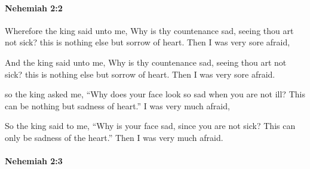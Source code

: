 		\paragraph{Nehemiah 2:2} %
			\label{NEHEMIAH-2-2}

			Wherefore the king said unto me, Why is thy countenance sad, seeing thou art not sick? this is nothing else but sorrow of heart. Then I was very sore afraid,

			\begin{versebox}
					\item[BHS] 
					\item[LXX] 
					\item[ASV] And the king said unto me, Why is thy countenance sad, seeing thou art not sick? this is nothing else but sorrow of heart. Then I was very sore afraid.
					\item[NIV] so the king asked me, “Why does your face look so sad when you are not ill? This can be nothing but sadness of heart.” I was very much afraid,
					\item[NRSV] So the king said to me, “Why is your face sad, since you are not sick? This can only be sadness of the heart.” Then I was very much afraid.
			\end{versebox}

		\paragraph{Nehemiah 2:3} %
			\label{NEHEMIAH-2-3}

